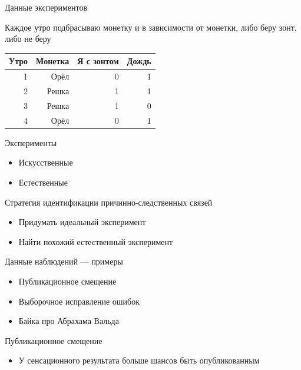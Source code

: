 \documentclass[ignorenonframetext,]{beamer}
\begin{document}
\begin{frame}{Данные экспериментов}

Каждое утро подбрасываю монетку и в зависимости от монетки, либо беру
зонт, либо не беру

\begin{longtable}[c]{@{}rrrr@{}}
\toprule
Утро & Монетка & Я с зонтом & Дождь\tabularnewline
\midrule
\endhead
1 & Орёл & 0 & 1\tabularnewline
2 & Решка & 1 & 1\tabularnewline
3 & Решка & 1 & 0\tabularnewline
4 & Орёл & 0 & 1\tabularnewline
\bottomrule
\end{longtable}

\end{frame}

\begin{frame}{Эксперименты}

\begin{itemize}
\item
  Искусственные
\item
  Естественные
\end{itemize}

\end{frame}

\begin{frame}{Стратегия идентификации причинно-следственных связей}

\begin{itemize}
\item
  Придумать идеальный эксперимент
\item
  Найти похожий естественный эксперимент
\end{itemize}

\end{frame}

\begin{frame}{Данные наблюдений --- примеры}

\begin{itemize}
\item
  Публикационное смещение
\item
  Выборочное исправление ошибок
\item
  Байка про Абрахама Вальда
\end{itemize}

\end{frame}

\begin{frame}{Публикационное смещение}

\begin{itemize}
\itemsep1pt\parskip0pt
\item
  У сенсационного результата больше шансов быть опубликованным
\end{itemize}

\end{frame}
\end{document}
